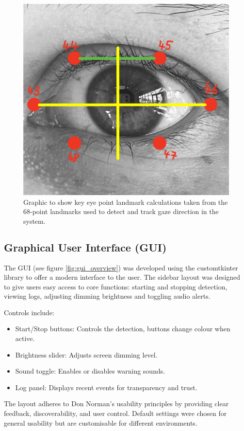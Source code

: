 \documentclass[12pt]{article}
\theoremstyle{plain}
\theoremstyle{definition}
\begin{document}
\begin{figure}[h!]
    \centering
    \includegraphics[width=0.8\linewidth]{img/Eye_calc.jpg}
    \caption{Graphic to show key eye point landmark calculations taken from the 68-point landmarks used to detect and track gaze direction in the system.}
    \label{fig:eye_calc}
\end{figure}

\subsection{Graphical User Interface (GUI)}

The GUI (see figure \ref{fig:gui_overview}) was developed using the customtkinter library to offer a modern interface to the user. The sidebar layout was designed to give users easy access to core functions: starting and stopping detection, viewing logs, adjusting dimming brightness and toggling audio alerts.

Controls include:
\begin{itemize}
  \item Start/Stop buttons: Controls the detection, buttons change colour when active.
  \item Brightness slider: Adjusts screen dimming level.
  \item Sound toggle: Enables or disables warning sounds.
  \item Log panel: Displays recent events for transparency and trust.
\end{itemize}

The layout adheres to Don Norman’s usability principles by providing clear feedback, discoverability, and user control. Default settings were chosen for general usability but are customisable for different environments.
\end{document}
